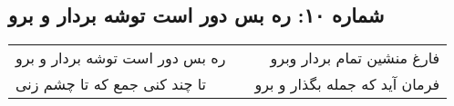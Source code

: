 \begin{center}
\section*{شماره ۱۰: ره بس دور است توشه بردار و برو}
\label{sec:010}
\begin{longtable}{l p{0.5cm} r}
ره بس دور است توشه بردار و برو
&&
فارغ منشین تمام بردار وبرو
\\
تا چند کنی جمع که تا چشم زنی
&&
فرمان آید که جمله بگذار و برو
\\
\end{longtable}
\end{center}
